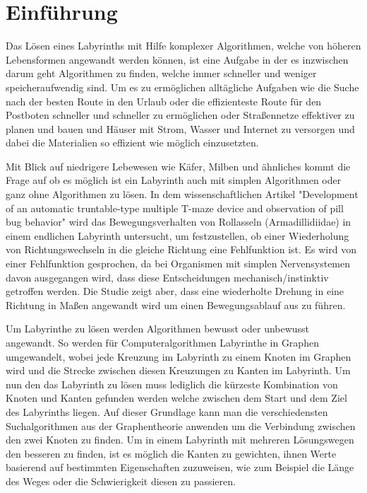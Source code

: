 \documentclass[12pt, a4paper, titlepage]{article}
\begin{document}

\tableofcontents

\newpage

\section{Einführung}

Das Lösen eines Labyrinths mit Hilfe komplexer Algorithmen, welche von höheren Lebensformen angewandt werden können, ist eine Aufgabe in der es inzwischen darum geht Algorithmen zu finden, welche immer schneller und weniger speicheraufwendig sind.
Um es zu ermöglichen alltägliche Aufgaben wie die Suche nach der besten Route in den Urlaub oder die effizienteste Route für den Postboten schneller und schneller zu ermöglichen oder Straßennetze effektiver zu planen und bauen und Häuser mit Strom, Wasser und Internet zu versorgen und dabei die Materialien so effizient wie möglich einzusetzten.


\bigskip

Mit Blick auf niedrigere Lebewesen wie Käfer, Milben und ähnliches kommt die Frage auf ob es möglich ist ein Labyrinth auch mit simplen Algorithmen oder ganz ohne Algorithmen zu lösen.
In dem wissenschaftlichen Artikel "Development of an automatic truntable-type multiple T-maze device and observation of pill bug behavior"\cite{bug} wird das Bewegungsverhalten von Rollasseln (Armadillidiidae) in einem endlichen Labyrinth untersucht, um festzustellen, ob einer Wiederholung von Richtungswechseln in die gleiche Richtung eine Fehlfunktion ist.
Es wird von einer Fehlfunktion gesprochen, da bei Organismen mit simplen Nervensystemen davon ausgegangen wird, dass diese Entscheidungen mechanisch/instinktiv getroffen werden.
Die Studie zeigt aber, dass eine wiederholte Drehung in eine Richtung in Maßen angewandt wird um einen Bewegungsablauf aus zu führen.

\bigskip

Um Labyrinthe zu lösen werden Algorithmen bewusst oder unbewusst angewandt.
So werden für Computeralgorithmen Labyrinthe in Graphen umgewandelt, wobei jede Kreuzung im Labyrinth zu einem Knoten im Graphen wird und die Strecke zwischen diesen Kreuzungen zu Kanten im Labyrinth.
Um nun den das Labyrinth zu lösen muss lediglich die kürzeste Kombination von Knoten und Kanten gefunden werden welche zwischen dem Start und dem Ziel des Labyrinths liegen.
Auf dieser Grundlage kann man die verschiedensten Suchalgorithmen aus der Graphentheorie anwenden um die Verbindung zwischen den zwei Knoten zu finden.\cite{mazetograph}
Um in einem Labyrinth mit mehreren Lösungswegen den besseren zu finden, ist es möglich die Kanten zu gewichten, ihnen Werte basierend auf bestimmten Eigenschaften zuzuweisen, wie zum Beispiel die Länge des Weges oder die Schwierigkeit diesen zu passieren.
\end{document}
